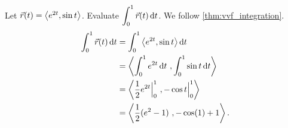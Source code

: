 \begin{example}\label{ex_vvfint1}%
Let $\vec r(t) =\left\langle e^{2t},\sin t\right\rangle$. Evaluate $\displaystyle \int_0^1 \vec r(t) \operatorname{d}\! t$.
\solution
We follow \autoref{thm:vvf_integration}.
\begin{align*}
\int_0^1 \vec r(t) \operatorname{d}\! t &= \int_0^1\left\langle e^{2t},\sin t\right\rangle\operatorname{d}\! t \\
				&=\left\langle \int_0^1 e^{2t}\operatorname{d}\! t\ , \int_0^1 \sin t \operatorname{d}\! t\right\rangle\\
				&=\left\langle \frac12e^{2t}\Big|_0^1\ , -\cos t\Big|_0^1\right\rangle\\
				&=\left\langle \frac12(e^2-1)\ , -\cos(1)+1\right\rangle
				.
\end{align*}
\end{example}

